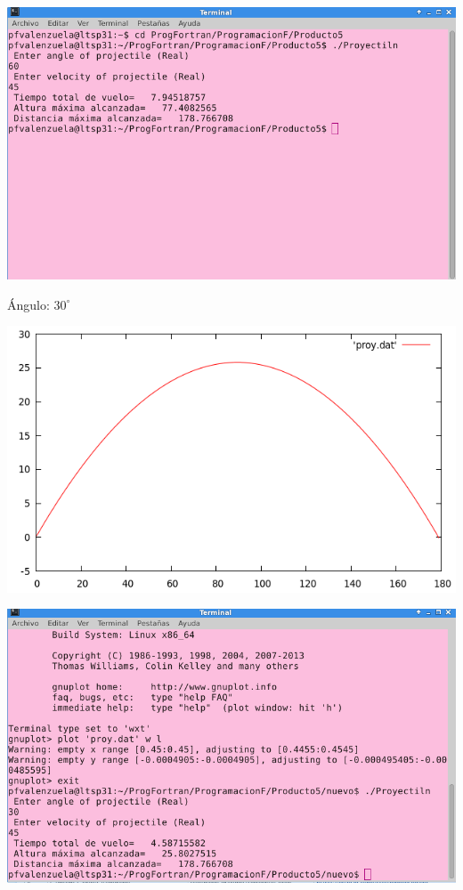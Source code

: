 \documentclass[12pt]{article}
\begin{document}
\begin{center}
\includegraphics[scale=0.6]{Resultados60.png}
\end{center}


Ángulo:  $30^{\circ}$
\begin{center}
\includegraphics[scale=0.6]{Grafica30.png}
\end{center}

\begin{center}
\includegraphics[scale=0.6]{Resultados30.png}
\end{center}
\end{document}
